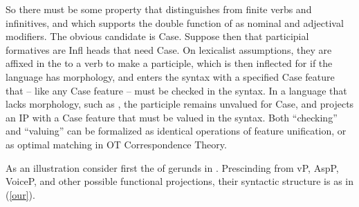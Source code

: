\documentclass[output=paper,
modfonts
]{LSP/langsci}
\newcommand{\rf}[1]{(\ref{#1})}
\begin{document}
\newpage 
So there must be some property that distinguishes  from finite verbs and
infinitives, and which supports the double function of  as nominal  and
adjectival modifiers.  The obvious candidate is Case.  Suppose then that participial formatives
are Infl heads that need Case.  On lexicalist assumptions, they are affixed in the 
to a verb to make a participle, which is then inflected for  if the language has 
morphology, and enters the syntax with a specified Case feature that – like any Case feature –
must be checked in the syntax. In a language that lacks  morphology, such as , the
participle remains unvalued for Case, and projects an IP with a Case feature that must be
valued in the syntax.  Both ``checking'' and ``valuing'' can be formalized as identical
operations of feature unification, or as optimal matching in OT Correspondence Theory.  

As an illustration consider first the  of gerunds in .  Prescinding from vP,
AspP, VoiceP, and other possible functional projections, their syntactic structure is as in
\rf{our}.
\end{document}
